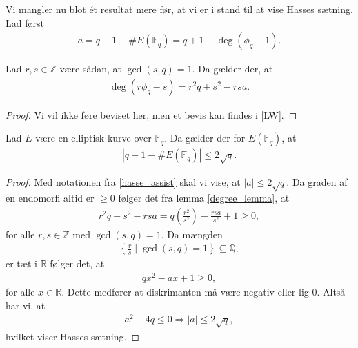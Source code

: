 Vi mangler nu blot ét resultat mere før, at vi er i stand til at vise Hasses sætning. Lad først
\begin{align}
	\label{hasse_assist}
	a = q + 1 - \#E(\mathbb{F}_q) = q + 1 - \deg (\phi_q - 1).
\end{align}

\begin{lemma}\label{degree_lemma}
Lad $r, s \in \mathbb{Z}$ være sådan, at $\gcd(s, q) = 1$. Da gælder der, at
\begin{align*}
	\deg(r \phi_q - s) = r^2 q + s^2 - rsa.
\end{align*}
\end{lemma}
\begin{proof}
Vi vil ikke føre beviset her, men et bevis kan findes i [LW].
\end{proof}


\begin{theorem}[Hasse]
Lad $E$ være en elliptisk kurve over $\mathbb{F}_q$. Da gælder der for
$E(\mathbb{F}_q)$, at 
\begin{align*}
	|q+1-\#E(\mathbb{F}_q)| \leq 2 \sqrt{q}.
\end{align*}
\end{theorem}
\begin{proof}
Med notationen fra \eqref{hasse_assist} skal vi vise, at $|a|\leq 2\sqrt{q}$. Da graden
af en endomorfi altid er $\geq 0$ følger det fra lemma \ref{degree_lemma}, at 
\begin{align*}
	r^2q+s^2 -rsa = q \left( \frac{r^2}{s^2} \right) - \frac{rsa}{s^2} + 1 
	\geq 0,
\end{align*}
for alle $r, s \in \mathbb{Z}$ med $\gcd(s, q)=1$. Da mængden
\begin{align*}
	\left\{ \frac{r}{s} \mid \gcd(s, q)=1 \right\} \subseteq \mathbb{Q},
\end{align*}
er tæt i $\mathbb{R}$ følger det, at 
\begin{align*}
	qx^2 - ax + 1 \geq 0,
\end{align*}
for alle $x \in \mathbb{R}$. Dette medfører at diskrimanten må være negativ eller lig $0$.
Altså har vi, at 
\begin{align*}
	a^2 - 4q \leq 0 \Rightarrow |a| \leq 2 \sqrt{q},
\end{align*}
hvilket viser Hasses sætning.
\end{proof}



























